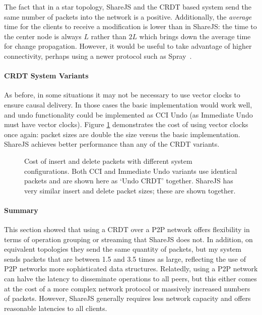 \documentclass[12pt,a4paper,twoside,openright]{report}
\begin{document}
			The fact that in a star topology, ShareJS and the CRDT based system send the same number of packets into the network is a positive. Additionally, the \textit{average} time for the clients to receive a modification is lower than in ShareJS: the time to the center node is always $L$ rather than $2L$ which brings down the average time for change propagation. However, it would be useful to take advantage of higher connectivity, perhaps using a newer protocol such as Spray~\cite{nedelec2015spray}.
			
			
		\paragraph{CRDT System Variants}
			As before, in some situations it may not be necessary to use vector clocks to ensure causal delivery. In those cases the basic implementation would work well, and undo functionality could be implemented as CCI Undo (as Immediate Undo must have vector clocks). Figure \ref{fig:sysvariationspackets} demonstrates the cost of using vector clocks once again: packet sizes are double the size versus the basic implementation. ShareJS achieves better performance than any of the CRDT variants.
		
			\begin{figure}[htb]
				\centering
				
				\caption[Behavior of System Variants - Packet Size] {Cost of insert and delete packets with different system configurations. Both CCI and Immediate Undo variants use identical packets and are shown here as `Undo CRDT' together. ShareJS has very similar insert and delete packet sizes; these are shown together.}
				\label{fig:sysvariationspackets}
			\end{figure}
			
		
		\paragraph{Summary}
			This section showed that using a CRDT over a P2P network offers flexibility in terms of operation grouping or streaming that ShareJS does not. In addition, on equivalent topologies they send the same quantity of packets, but my system sends packets that are between 1.5 and 3.5 times as large, reflecting the use of P2P networks more sophisticated data structures. Relatedly, using a P2P network can halve the latency to disseminate operations to all peers, but this either comes at the cost of a more complex network protocol or massively increased numbers of packets. However, ShareJS generally requires less network capacity and offers reasonable latencies to all clients.
			
\end{document}
